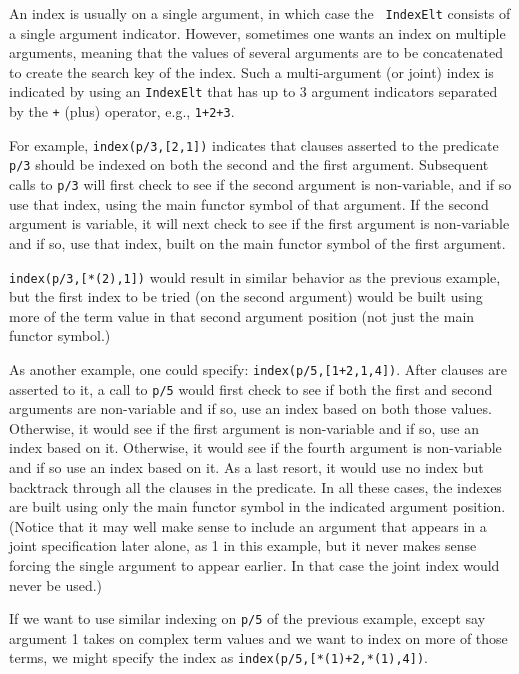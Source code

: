 \begin{description}
\begin{itemize}
\begin{itemize}
An index is usually on a single argument, in which case the {\tt
IndexElt} consists of a single argument indicator.  However, sometimes
one wants an index on multiple arguments, meaning that the values of
several arguments are to be concatenated to create the search key of
the index.  Such a multi-argument (or joint) index is indicated by
using an {\tt IndexElt} that has up to 3 argument indicators separated
by the {\tt +} (plus) operator, e.g., {\tt 1+2+3}.

For example, {\tt index(p/3,[2,1])} indicates that clauses asserted to
the predicate {\tt p/3} should be indexed on both the second and the
first argument.  Subsequent calls to {\tt p/3} will first check to see
if the second argument is non-variable, and if so use that index, using
the main functor symbol of that argument. If the second argument is
variable, it will next check to see if the first argument is
non-variable and if so, use that index, built on the main functor
symbol of the first argument.  

{\tt index(p/3,[*(2),1])} would result in similar behavior as the
previous example, but the first index to be tried (on the second
argument) would be built using more of the term value in that second
argument position (not just the main functor symbol.)

As another example, one could specify: {\tt index(p/5,[1+2,1,4])}.
After clauses are asserted to it, a call to {\tt p/5} would first
check to see if both the first and second arguments are non-variable
and if so, use an index based on both those values. Otherwise, it
would see if the first argument is non-variable and if so, use an index
based on it. Otherwise, it would see if the fourth argument is
non-variable and if so use an index based on it. As a last resort, it
would use no index but backtrack through all the clauses in the
predicate.  In all these cases, the indexes are built using only the
main functor symbol in the indicated argument position. (Notice that
it may well make sense to include an argument that appears in a joint
specification later alone, as 1 in this example, but it never makes
sense forcing the single argument to appear earlier. In that case the
joint index would never be used.)

If we want to use similar indexing on {\tt p/5} of the previous
example, except say argument 1 takes on complex term values and we
want to index on more of those terms, we might specify the index as
{\tt index(p/5,[*(1)+2,*(1),4])}.

\end{itemize}


\end{itemize}
\end{description}
